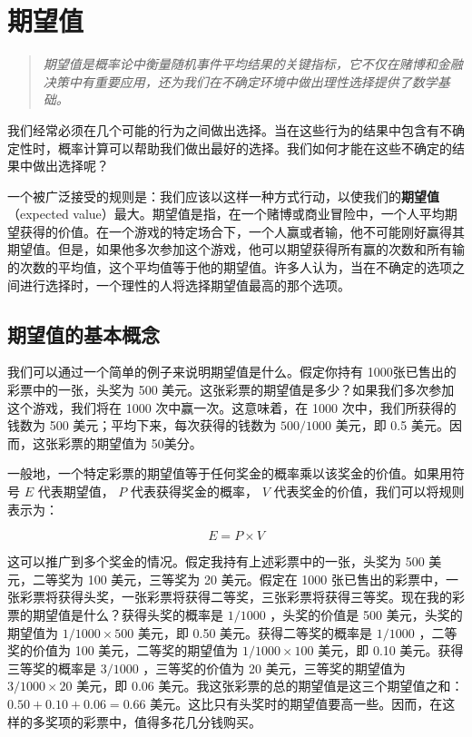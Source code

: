 \section{期望值}

\begin{quotation}
\textit{期望值是概率论中衡量随机事件平均结果的关键指标，它不仅在赌博和金融决策中有重要应用，还为我们在不确定环境中做出理性选择提供了数学基础。}
\end{quotation}

我们经常必须在几个可能的行为之间做出选择。当在这些行为的结果中包含有不确定性时，概率计算可以帮助我们做出最好的选择。我们如何才能在这些不确定的结果中做出选择呢？

一个被广泛接受的规则是：我们应该以这样一种方式行动，以使我们的\textbf{期望值}（expected value）最大。期望值是指，在一个赌博或商业冒险中，一个人平均期望获得的价值。在一个游戏的特定场合下，一个人赢或者输，他不可能刚好赢得其期望值。但是，如果他多次参加这个游戏，他可以期望获得所有赢的次数和所有输的次数的平均值，这个平均值等于他的期望值。许多人认为，当在不确定的选项之间进行选择时，一个理性的人将选择期望值最高的那个选项。

\subsection{期望值的基本概念}

我们可以通过一个简单的例子来说明期望值是什么。假定你持有 1000张已售出的彩票中的一张，头奖为 500 美元。这张彩票的期望值是多少？如果我们多次参加这个游戏，我们将在 1000 次中赢一次。这意味着，在 1000 次中，我们所获得的钱数为 500 美元；平均下来，每次获得的钱数为 $500 / 1000$ 美元，即 0.5 美元。因而，这张彩票的期望值为 50美分。

一般地，一个特定彩票的期望值等于任何奖金的概率乘以该奖金的价值。如果用符号 $E$ 代表期望值， $P$ 代表获得奖金的概率， $V$ 代表奖金的价值，我们可以将规则表示为：

$$
E=P \times V
$$

这可以推广到多个奖金的情况。假定我持有上述彩票中的一张，头奖为 500 美元，二等奖为 100 美元，三等奖为 20 美元。假定在 1000 张已售出的彩票中，一张彩票将获得头奖，一张彩票将获得二等奖，三张彩票将获得三等奖。现在我的彩票的期望值是什么？获得头奖的概率是 $1 / 1000$ ，头奖的价值是 500 美元，头奖的期望值为 $1 / 1000 \times 500$ 美元，即 0.50 美元。获得二等奖的概率是 $1 / 1000$ ，二等奖的价值为 100 美元，二等奖的期望值为 $1 / 1000 \times 100$ 美元，即 0.10 美元。获得三等奖的概率是 $3 / 1000$ ，三等奖的价值为 20 美元，三等奖的期望值为 $3 / 1000 \times 20$ 美元，即 0.06 美元。我这张彩票的总的期望值是这三个期望值之和： $0.50+0.10+0.06=0.66$ 美元。这比只有头奖时的期望值要高一些。因而，在这样的多奖项的彩票中，值得多花几分钱购买。

